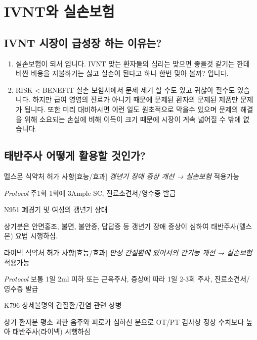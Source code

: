 \section*{IVNT와 실손보험}
\subsection*{IVNT 시장이 급성장 하는 이유는?}
\begin{enumerate}[첫번째]\tightlist
\item 실손보험이 되서 입니다. IVNT 맞는 환자들의 심리는 맞으면 좋을것 같기는 한데 비싼 비용을 지불하기는 싫고 실손이 된다고 하니 한번 맞아 볼까? 입니다.
\item RISK < BENEFIT \newline 실손 보험사에서 문제 제기 할 수도 있고 귀찮아 질수도 있습니다. 하지만 급여 영영의 진료가 아니기 때문에 문제된 환자의 문제된 제품만 문제가 됩니다. 또한 미리 대비하시면 이런 일도 원초적으로 막을수 있으며 문제의 해결을 위해 소요되는 손실에 비해 이득이 크기 때문에 시장이 계속 넓어질 수 밖에 없습니다.
\end{enumerate}\tightlist

\subsection*{태반주사 어떻게 활용할 것인가?}
\begin{commentbox}{멜스몬}
식약처 허가 사항[효능/효과] \emph{갱년기 장애 증상 개선 → 실손보험} 적용가능 \par
\emph{Protocol} 주1회 1회에 3Ample SC, 진료소견서/영수증 발급
\begin{description}\tightlist
\item[적합상병] N951 폐경기 및 여성의 갱년기 상태
\item[소견서 내용] 상기분은 안면홍조, 불면, 불안증, 답답증 등 갱년기 장애 증상이 심하여 태반주사(멜스몬) 요법 시행하심.
\end{description}
\end{commentbox}

\begin{commentbox}{라이넥}
식약처 허가 사항[효능/효과] \emph{만성 간질환에 있어서의 간기능 개선 → 실손보험} 적용가능 \par
\emph{Protocol} 보통 1일 2ml 피하 또는 근육주사, 증상에 따라 1일 2-3회 주사, 진료소견서/영수증 발급\par
\begin{description}\tightlist
\item[적합상병] K796 상세불명의 간질환/간염 관련 상병
\item[소견서 내용] 상기 환자분 평소 과한 음주와 피로가 심하신 분으로 OT/PT 검사상 정상 수치보다 높아 태반주사(라이넥) 시행하심
\end{description}
\end{commentbox}

